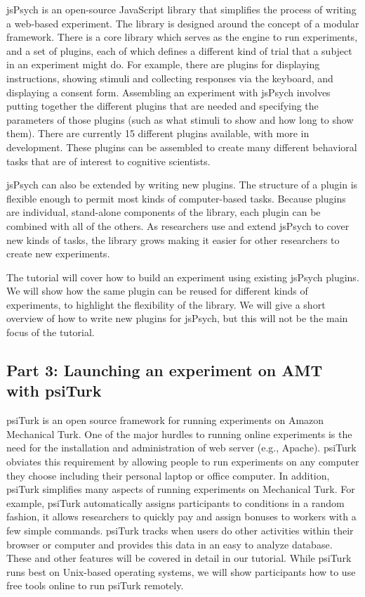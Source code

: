 \documentclass[10pt,letterpaper]{article}
\begin{document}
jsPsych is an open-source JavaScript library that simplifies the process of writing a web-based experiment. The library is designed around the concept of a modular framework. There is a core library which serves as the engine to run experiments, and a set of plugins, each of which defines a different kind of trial that a subject in an experiment might do. For example, there are plugins for displaying instructions, showing stimuli and collecting responses via the keyboard, and displaying a consent form. Assembling an experiment with jsPsych involves putting together the different plugins that are needed and specifying the parameters of those plugins (such as what stimuli to show and how long to show them). There are currently 15 different plugins available, with more in development. These plugins can be assembled to create many different behavioral tasks that are of interest to cognitive scientists.

jsPsych can also be extended by writing new plugins. The structure of a plugin is flexible enough to permit most kinds of computer-based tasks. Because plugins are individual, stand-alone components of the library, each plugin can be combined with all of the others. As researchers use and extend jsPsych to cover new kinds of tasks, the library grows making it easier for other researchers to create new experiments.

The tutorial will cover how to build an experiment using existing jsPsych plugins. We will show how the same plugin can be reused for different kinds of experiments, to highlight the flexibility of the library. We will give a short overview of how to write new plugins for jsPsych, but this will not be the main focus of the tutorial.

\subsection{Part 3: Launching an experiment on AMT with psiTurk}

psiTurk is an open source framework for running experiments on Amazon Mechanical Turk.  One of the major hurdles to running online experiments
is the need for the installation and administration of web server (e.g., Apache).  psiTurk obviates this requirement by allowing people to run experiments
on any computer they choose including their personal laptop or office computer.  In addition, psiTurk simplifies many aspects of running experiments
on Mechanical Turk.  For example, psiTurk automatically assigns participants to conditions in a random fashion, it allows researchers to quickly
pay and assign bonuses to workers with a few simple commands.  psiTurk tracks when users do other activities within their browser or computer
and provides this data in an easy to analyze database.  These and other features will be covered in detail in our tutorial.  While psiTurk runs best
on Unix-based operating systems, we will show participants how to use free tools online to run psiTurk remotely.
\end{document}
